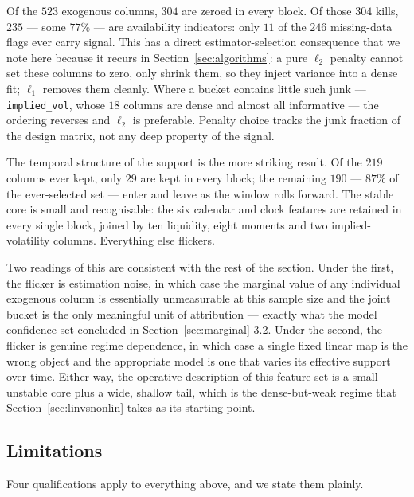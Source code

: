 Of the $523$ exogenous columns, $304$ are zeroed in every block. Of those $304$ kills, $235$
--- some $77\%$ --- are availability indicators: only $11$ of the $246$ missing-data flags
ever carry signal. This has a direct estimator-selection consequence that we note here
because it recurs in Section~\ref{sec:algorithms}: a pure $\ell_2$ penalty
\citep{HoerlKennard1970} cannot set these columns to zero, only shrink them, so they inject
variance into a dense fit; $\ell_1$ removes them cleanly. Where a bucket contains little
such junk --- \texttt{implied\_vol}, whose $18$ columns are dense and almost all
informative --- the ordering reverses and $\ell_2$ is preferable. Penalty choice tracks the
junk fraction of the design matrix, not any deep property of the signal.

The temporal structure of the support is the more striking result. Of the $219$ columns ever
kept, only $29$ are kept in every block; the remaining $190$ --- $87\%$ of the ever-selected
set --- enter and leave as the window rolls forward. The stable core is small and
recognisable: the six calendar and clock features are retained in every single block, joined
by ten liquidity, eight moments and two implied-volatility columns. Everything else
flickers.

Two readings of this are consistent with the rest of the section. Under the first, the
flicker is estimation noise, in which case the marginal value of any individual exogenous
column is essentially unmeasurable at this sample size and the joint bucket is the only
meaningful unit of attribution --- exactly what the model confidence set concluded in
Section~\ref{sec:marginal} 3.2. Under the second, the flicker is genuine regime dependence,
in which case a single fixed linear map is the wrong object and the appropriate model is one
that varies its effective support over time. Either way, the operative description of this
feature set is a small unstable core plus a wide, shallow tail, which is the dense-but-weak
regime that Section~\ref{sec:linvsnonlin} takes as its starting point.

\subsection{Limitations}

Four qualifications apply to everything above, and we state them plainly.

